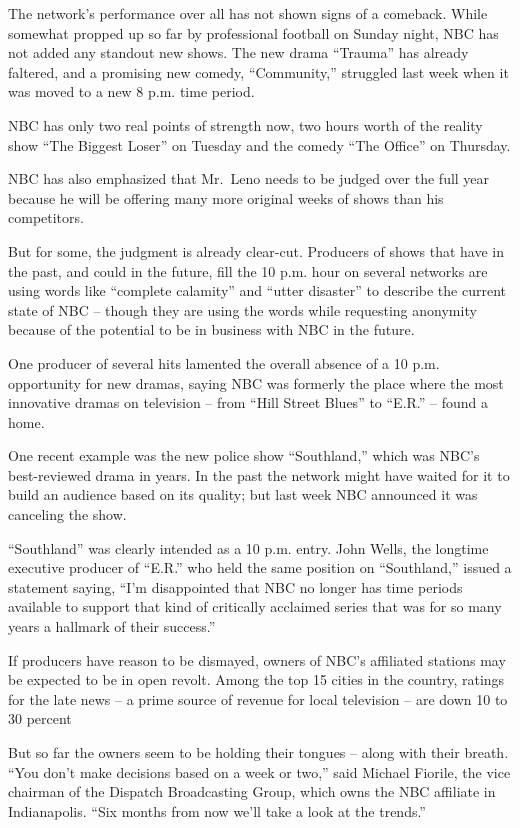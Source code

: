 ﻿\documentclass[12pt]{article}
\begin{document}
The network's performance over all has not shown signs of a comeback. While somewhat propped up so
far by professional football on Sunday night, NBC has not added any standout new shows. The new
drama ``Trauma'' has already faltered, and a promising new comedy, ``Community,'' struggled last
week when it was moved to a new 8 p.m. time period.

NBC has only two real points of strength now, two hours worth of the reality show ``The Biggest
Loser'' on Tuesday and the comedy ``The Office'' on Thursday.

NBC has also emphasized that Mr.~Leno needs to be judged over the full year because he will be
offering many more original weeks of shows than his competitors.

But for some, the judgment is already clear-cut. Producers of shows that have in the past, and could
in the future, fill the 10 p.m. hour on several networks are using words like ``complete calamity''
and ``utter disaster'' to describe the current state of NBC -- though they are using the words while
requesting anonymity because of the potential to be in business with NBC in the future.

One producer of several hits lamented the overall absence of a 10 p.m. opportunity for new dramas,
saying NBC was formerly the place where the most innovative dramas on television -- from ``Hill
Street Blues'' to ``E.R.'' -- found a home.

One recent example was the new police show ``Southland,'' which was NBC's best-reviewed drama in
years. In the past the network might have waited for it to build an audience based on its quality;
but last week NBC announced it was canceling the show.

``Southland'' was clearly intended as a 10 p.m. entry. John Wells, the longtime executive producer
of ``E.R.'' who held the same position on ``Southland,'' issued a statement saying, ``I'm
disappointed that NBC no longer has time periods available to support that kind of critically
acclaimed series that was for so many years a hallmark of their success.''

If producers have reason to be dismayed, owners of NBC's affiliated stations may be expected to be
in open revolt. Among the top 15 cities in the country, ratings for the late news -- a prime source
of revenue for local television -- are down 10 to 30 percent

But so far the owners seem to be holding their tongues -- along with their breath. ``You don't make
decisions based on a week or two,'' said Michael Fiorile, the vice chairman of the Dispatch
Broadcasting Group, which owns the NBC affiliate in Indianapolis. ``Six months from now we'll take a
look at the trends.''
\end{document}
